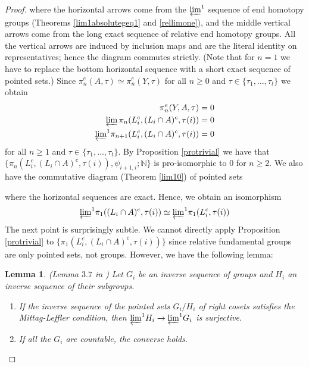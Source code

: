 \documentclass[a4paper,11pt]{article}
\theoremstyle{definition}
\theoremstyle{plain}
\newtheorem{lemma}[definition]{Lemma}
\theoremstyle{remark}
\begin{document}
{\begin{proof}
where the horizontal arrows come from the $\varprojlim^1$ sequence of end homotopy groups (Theorems \ref{lim1absolutegeq1} and \ref{rellimone}), and the middle vertical arrows come from the long exact sequence of relative end homotopy groups. All the vertical arrows are induced by inclusion maps and are the literal identity on representatives; hence the diagram commutes strictly. (Note that for $n=1$ we have to replace the bottom horizontal sequence with a short exact sequence of pointed sets.) Since $\pi_{n}^e(A,\tau)\simeq \pi_{n}^e(Y,\tau)$ for all $n\geq 0$ and $\tau\in \{\tau_{1},\dots, \tau_{t}\}$ we obtain 
\begin{align*}
\pi_{n}^e(Y,A,\tau) = 0 \\
\varprojlim \pi_{n}(L_i^c, (L_i\cap A)^c,\tau(i)) = 0\\
{\varprojlim}^{1} \pi_{n+1}(L_i^c, (L_i\cap A)^c,\tau(i)) = 0
\end{align*}
for all $n\geq 1$ and $\tau \in \{\tau_{1},\dots,\tau_{t}\}$. By Proposition \ref{protrivial} we have that  $\{\pi_{n}(L_{i}^c,(L_i\cap A)^c,\tau(i)),\psi_{i+1,i};\mathbb{N}\}$ is pro-isomorphic to $0$ for $n\geq 2$. We also have the commutative diagram (Theorem \ref{lim10}) of pointed sets




\begin{figure}[H]
\end{figure}

where the horizontal sequences are exact. Hence, we obtain an isomorphism
\begin{align*}
{\varprojlim}^{1} \pi_{1}((L_i\cap A)^c,\tau(i))\simeq {\varprojlim}^{1} \pi_{1}(L_i^c,\tau(i))
\end{align*} 
The next point is surprisingly subtle. We cannot directly apply Proposition \ref{protrivial} to  $\{\pi_{1}(L_{i}^c,(L_i\cap A)^c,\tau(i))\}$ since relative fundamental groups are only pointed sets, not groups. However, we have the following lemma:

\begin{lemma} (Lemma $3.7$ in \cite{melikhov2009steenrod}) Let $G_{i}$ be an inverse sequence of groups and $H_i$ an inverse sequence of their subgroups. 
\begin{enumerate}
\item If the inverse sequence of the pointed sets $G_{i}/H_{i}$ of right cosets satisfies the Mittag-Leffler condition, then ${\varprojlim}^{1} H_{i}\rightarrow {\varprojlim}^{1} G_{i}$ is surjective.
\item If all the $G_i$ are countable, the converse holds.
\end{enumerate} 
\end{lemma}


\end{proof}}
\end{document}
